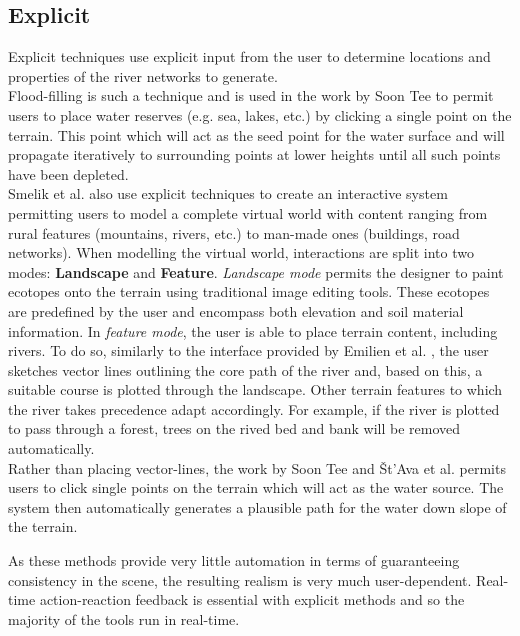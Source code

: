 \subsection{Explicit}

Explicit techniques use explicit input from the user to determine locations and properties of the river networks to generate.\\

Flood-filling is such a technique and is used in the work by Soon Tee \cite{Teoh2008} to permit users to place water reserves (e.g. sea, lakes, etc.) by clicking a single point on the terrain. This point which will act as the seed point for the water surface and will propagate iteratively to surrounding points at lower heights until all such points have been depleted. \\

Smelik et al. also use explicit techniques to create an interactive system permitting users to model a complete virtual world with content ranging from rural features (mountains, rivers, etc.) to man-made ones (buildings, road networks). When modelling the virtual world, interactions are split into two modes: \textbf{Landscape} and \textbf{Feature}. \textit{Landscape mode} permits the designer to paint ecotopes onto the terrain using traditional image editing tools. These ecotopes are predefined by the user and encompass both elevation and soil material information. In \textit{feature mode}, the user is able to place terrain content, including rivers. To do so, similarly to the interface provided by Emilien et al. \cite{Emilien2014}, the user sketches vector lines outlining the core path of the river and, based on this, a suitable course is plotted through the landscape. Other terrain features to which the river takes precedence adapt accordingly. For example, if the river is plotted to pass through a forest, trees on the rived bed and bank will be removed automatically. \\

Rather than placing vector-lines, the work by Soon Tee \cite{Teoh2008} and Št'Ava et al. \cite{StAva2008} permits users to click single points on the terrain which will act as the water source. The system then automatically generates a plausible path for the water down slope of the terrain.

As these methods provide very little automation in terms of guaranteeing consistency in the scene, the resulting realism is very much user-dependent. Real-time action-reaction feedback is essential with explicit methods and so the majority of the tools run in real-time.